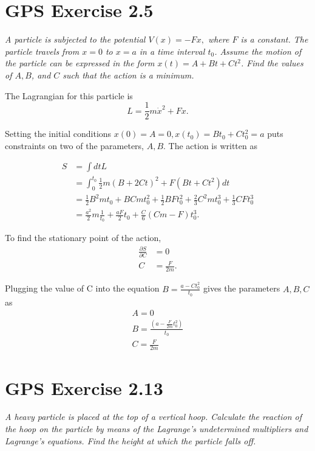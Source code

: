 \documentclass{article}
\begin{document}
\section{GPS Exercise 2.5}
\textit{A particle is subjected to the potential $V(x)=-F x,$ where $F$ is a constant. The particle travels from $x=0$ to $x=a$ in a time interval $t_{0}$. Assume the motion of the particle can be expressed in the form $x(t)=A+B t+C t^{2}$. Find the values of $A, B$, and $C$ such that the action is a minimum.}

The Lagrangian for this particle is
\begin{equation*}
    L=\frac{1}{2} m \dot{x}^{2}+F x. 
\end{equation*}

Setting the initial conditions $x(0) = A = 0, x(t_0) = B t_{0}+C t_{0}^{2} = a$ puts constraints on two of the parameters, $A,B$. The action is written as

\begin{align*}
    S &= \int{dt L}\\
     &= \int_{0}^{t_{0}} \frac{1}{2} m(B+2 C t)^{2}+F\left(B t+C t^{2}\right) d t\\
     &= \frac{1}{2} B^2 m t_0+B C m t_0^2+\frac{1}{2} B F t_0^2+\frac{2}{3} C^2 m t_0^3+\frac{1}{3} C F t_0^3\\
     &= \frac{a^{2}}{2} m \frac{1}{t_{0}}+\frac{a F}{2} t_{0}+\frac{C}{6}(C m-F) t_{0}^{3}. 
\end{align*}

To find the stationary point of the action, 
\begin{align}
    \frac{\partial S}{\partial C} &= 0\\
    C &= \frac{F}{2 m }.
\end{align}

Plugging the value of C into the equation $ B=\frac{a-C t_{0}^{2}}{t_{0}}$ gives the parameters $A,B,C$ as
\begin{equation*}
\boxed{
    \begin{array}{l}
        A=0 \\
        B=\frac{\left(a-\frac{F}{2 m} t_{0}^{2}\right)}{t_{0}} \\
        C=\frac{F}{2 m}
    \end{array}
    }
\end{equation*}

\newpage

\section{GPS Exercise 2.13}
\textit{A heavy particle is placed at the top of a vertical hoop. Calculate the reaction of the hoop on the particle by means of the Lagrange's undetermined multipliers and Lagrange's equations. Find the height at which the particle falls off.}
\end{document}
